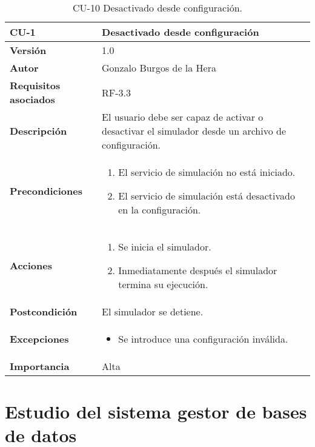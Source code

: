 \begin{table}[H]
	\centering
	\begin{tabularx}{\linewidth}{ p{} p{} }
		\toprule
		\textbf{CU-1}    & \textbf{Desactivado desde configuración}\\
		\toprule
		\textbf{Versión}              & 1.0    \\
		\textbf{Autor}                & Gonzalo Burgos de la Hera \\
		\textbf{Requisitos asociados} & RF-3.3 \\
		\textbf{Descripción}          & El usuario debe ser capaz de activar o desactivar el simulador desde un archivo de configuración. \\
		\textbf{Precondiciones}       & 
        \begin{enumerate}
			\def\labelenumi{\arabic{enumi}.}
			\tightlist
            \item El servicio de simulación no está iniciado.
			\item El servicio de simulación está desactivado en la configuración.
		\end{enumerate}\\
		\textbf{Acciones}             &
		\begin{enumerate}
			\def\labelenumi{\arabic{enumi}.}
			\tightlist
			\item Se inicia el simulador.
			\item Inmediatamente después el simulador termina su ejecución.
		\end{enumerate}\\
		\textbf{Postcondición}        & El simulador se detiene. \\
		\textbf{Excepciones}          & 
        \begin{itemize}
			\tightlist
			\item Se introduce una configuración inválida.
        \end{itemize} \\
		\textbf{Importancia}          & Alta \\
		\bottomrule
	\end{tabularx}
	\caption{CU-10 Desactivado desde configuración.}
\end{table}

\section{Estudio del sistema gestor de bases de datos}

